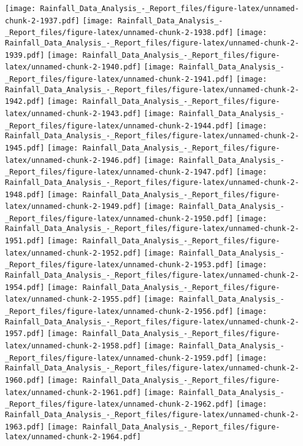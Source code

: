 \documentclass[
]{article}
\begin{document}
\texttt{[image: Rainfall\_Data\_Analysis\_-\_Report\_files/figure-latex/unnamed-chunk-2-1937.pdf]}
\texttt{[image: Rainfall\_Data\_Analysis\_-\_Report\_files/figure-latex/unnamed-chunk-2-1938.pdf]}
\texttt{[image: Rainfall\_Data\_Analysis\_-\_Report\_files/figure-latex/unnamed-chunk-2-1939.pdf]}
\texttt{[image: Rainfall\_Data\_Analysis\_-\_Report\_files/figure-latex/unnamed-chunk-2-1940.pdf]}
\texttt{[image: Rainfall\_Data\_Analysis\_-\_Report\_files/figure-latex/unnamed-chunk-2-1941.pdf]}
\texttt{[image: Rainfall\_Data\_Analysis\_-\_Report\_files/figure-latex/unnamed-chunk-2-1942.pdf]}
\texttt{[image: Rainfall\_Data\_Analysis\_-\_Report\_files/figure-latex/unnamed-chunk-2-1943.pdf]}
\texttt{[image: Rainfall\_Data\_Analysis\_-\_Report\_files/figure-latex/unnamed-chunk-2-1944.pdf]}
\texttt{[image: Rainfall\_Data\_Analysis\_-\_Report\_files/figure-latex/unnamed-chunk-2-1945.pdf]}
\texttt{[image: Rainfall\_Data\_Analysis\_-\_Report\_files/figure-latex/unnamed-chunk-2-1946.pdf]}
\texttt{[image: Rainfall\_Data\_Analysis\_-\_Report\_files/figure-latex/unnamed-chunk-2-1947.pdf]}
\texttt{[image: Rainfall\_Data\_Analysis\_-\_Report\_files/figure-latex/unnamed-chunk-2-1948.pdf]}
\texttt{[image: Rainfall\_Data\_Analysis\_-\_Report\_files/figure-latex/unnamed-chunk-2-1949.pdf]}
\texttt{[image: Rainfall\_Data\_Analysis\_-\_Report\_files/figure-latex/unnamed-chunk-2-1950.pdf]}
\texttt{[image: Rainfall\_Data\_Analysis\_-\_Report\_files/figure-latex/unnamed-chunk-2-1951.pdf]}
\texttt{[image: Rainfall\_Data\_Analysis\_-\_Report\_files/figure-latex/unnamed-chunk-2-1952.pdf]}
\texttt{[image: Rainfall\_Data\_Analysis\_-\_Report\_files/figure-latex/unnamed-chunk-2-1953.pdf]}
\texttt{[image: Rainfall\_Data\_Analysis\_-\_Report\_files/figure-latex/unnamed-chunk-2-1954.pdf]}
\texttt{[image: Rainfall\_Data\_Analysis\_-\_Report\_files/figure-latex/unnamed-chunk-2-1955.pdf]}
\texttt{[image: Rainfall\_Data\_Analysis\_-\_Report\_files/figure-latex/unnamed-chunk-2-1956.pdf]}
\texttt{[image: Rainfall\_Data\_Analysis\_-\_Report\_files/figure-latex/unnamed-chunk-2-1957.pdf]}
\texttt{[image: Rainfall\_Data\_Analysis\_-\_Report\_files/figure-latex/unnamed-chunk-2-1958.pdf]}
\texttt{[image: Rainfall\_Data\_Analysis\_-\_Report\_files/figure-latex/unnamed-chunk-2-1959.pdf]}
\texttt{[image: Rainfall\_Data\_Analysis\_-\_Report\_files/figure-latex/unnamed-chunk-2-1960.pdf]}
\texttt{[image: Rainfall\_Data\_Analysis\_-\_Report\_files/figure-latex/unnamed-chunk-2-1961.pdf]}
\texttt{[image: Rainfall\_Data\_Analysis\_-\_Report\_files/figure-latex/unnamed-chunk-2-1962.pdf]}
\texttt{[image: Rainfall\_Data\_Analysis\_-\_Report\_files/figure-latex/unnamed-chunk-2-1963.pdf]}
\texttt{[image: Rainfall\_Data\_Analysis\_-\_Report\_files/figure-latex/unnamed-chunk-2-1964.pdf]}
\end{document}
